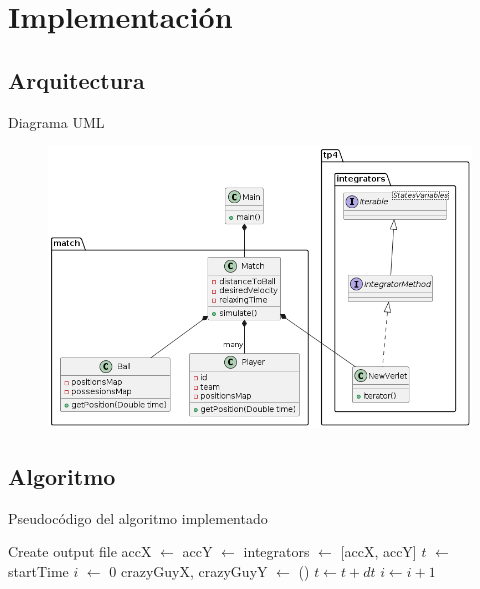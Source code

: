 \documentclass{beamer}
\begin{document}
    \section{Implementación}

        \subsection{Arquitectura}

            \begin{frame}{Diagrama UML}
                \vspace*{-0.2cm}
                \begin{figure}[htbp]
                    \centering
                    \includegraphics[width=\textwidth]{./architecture}
                    \label{fig:architecture}
                \end{figure}
            \end{frame}

        \subsection{Algoritmo}

            \begin{frame}{Pseudocódigo del algoritmo implementado}{}
                \begin{algorithmic}[1]
                    \ttfamily \scriptsize
                    \State Create output file
                    \State accX $\gets$ 
                    \State accY $\gets$ 
                    \State integrators $\gets$ [accX, accY]
                    \State $t$ $\gets$ startTime
                    \State $i$ $\gets$ 0
                        \State crazyGuyX, crazyGuyY $\gets$ ()
                        \State {}
                            \State {}
                        \EndIf
                        \State $t \gets t + dt$
                        \State $i \gets i + 1$
                    \EndWhile
                \end{algorithmic}
            \end{frame}
\end{document}

